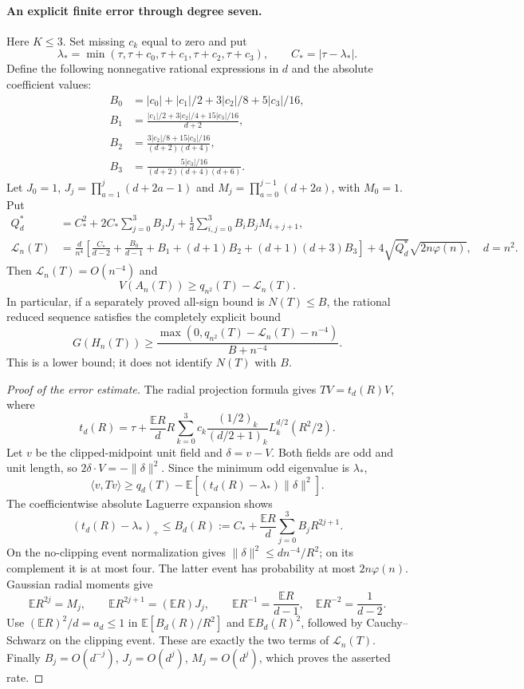 \documentclass[11pt]{article}
\begin{document}
\paragraph{An explicit finite error through degree seven.}
Here $K\leq3$.  Set missing $c_k$ equal to zero and put
\[
 \lambda_*=\min(\tau,\tau+c_0,\tau+c_1,\tau+c_2,\tau+c_3),
 \qquad C_* = |\tau-\lambda_*|.
\]
Define the following nonnegative rational expressions in $d$ and
the absolute coefficient values:
\begin{align*}
 B_0&=|c_0|+|c_1|/2+3|c_2|/8+5|c_3|/16,\\
 B_1&=\frac{|c_1|/2+3|c_2|/4+15|c_3|/16}{d+2},\\
 B_2&=\frac{3|c_2|/8+15|c_3|/16}{(d+2)(d+4)},\\
 B_3&=\frac{5|c_3|/16}{(d+2)(d+4)(d+6)}.
\end{align*}
Let $J_0=1$, $J_j=\prod_{a=1}^j(d+2a-1)$ and
$M_j=\prod_{a=0}^{j-1}(d+2a)$, with $M_0=1$.  Put
\begin{align*}
 Q_d^*&=C_*^2+2C_*\sum_{j=0}^3B_jJ_j
          +\frac1d\sum_{i,j=0}^3B_iB_jM_{i+j+1},\\
 \mathcal L_n(T)&=
 \frac{d}{n^4}\left[
 \frac{C_*}{d-2}+\frac{B_0}{d-1}+B_1
 +(d+1)B_2+(d+1)(d+3)B_3\right]
       +4\sqrt{Q_d^*}\sqrt{2n\varphi(n)},\quad d=n^2.
\end{align*}
Then $\mathcal L_n(T)=O(n^{-4})$ and
\begin{equation}\label{eq:new-tail-finite-lower}
 V(A_n(T))\geq q_{n^2}(T)-\mathcal L_n(T).
\end{equation}
In particular, if a separately proved all-sign bound is $N(T)\leq B$,
the rational reduced sequence satisfies the completely explicit bound
\[
 G(H_n(T))\geq
 \frac{\max(0,q_{n^2}(T)-\mathcal L_n(T)-n^{-4})}{B+n^{-4}}.
\]
This is a lower bound; it does not identify $N(T)$ with $B$.

\begin{proof}[Proof of the error estimate]
The radial projection formula gives $TV=t_d(R)V$, where
\[
 t_d(R)=\tau+\frac{\mathbb ER}{d}R\sum_{k=0}^3
 c_k\frac{(1/2)_k}{(d/2+1)_k}L_k^{d/2}(R^2/2).
\]
Let $v$ be the clipped-midpoint unit field and $\delta=v-V$.
Both fields are odd and unit length, so
$2\delta\cdot V=-\|\delta\|^2$.  Since the minimum odd eigenvalue
is $\lambda_*$,
\[
 \langle v,Tv\rangle\geq q_d(T)
             -\mathbb E[(t_d(R)-\lambda_*)\|\delta\|^2].
\]
The coefficientwise absolute Laguerre expansion shows
\[
 (t_d(R)-\lambda_*)_+\leq
 B_d(R):=C_*+\frac{\mathbb ER}{d}
                         \sum_{j=0}^3 B_jR^{2j+1}.
\]
On the no-clipping event normalization gives
$\|\delta\|^2\leq dn^{-4}/R^2$; on its complement it is at most
four.  The latter event has probability at most $2n\varphi(n)$.
Gaussian radial moments give
\[
 \mathbb ER^{2j}=M_j,\qquad
 \mathbb ER^{2j+1}=(\mathbb ER)J_j,\qquad
 \mathbb ER^{-1}=\frac{\mathbb ER}{d-1},\quad
 \mathbb ER^{-2}=\frac1{d-2}.
\]
Use $(\mathbb ER)^2/d=a_d\leq1$ in
$\mathbb E[B_d(R)/R^2]$ and $\mathbb EB_d(R)^2$, followed by
Cauchy--Schwarz on the clipping event.  These are exactly the two
terms of $\mathcal L_n(T)$.  Finally $B_j=O(d^{-j})$, $J_j=O(d^j)$,
$M_j=O(d^j)$, which proves the asserted rate.
\end{proof}
\end{document}
